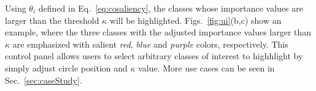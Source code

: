 Using $\theta_i$  defined in Eq.~\ref{eq:cosaliency}, the classes whose importance values are larger than the threshold $\kappa$ will be highlighted.
Figs.~\ref{fig:ui}(b,c) show an example, where the three classes with the adjusted importance values larger than $\kappa$ are emphasized with salient \emph{red}, \emph{blue} and \emph{purple} colors, respectively.
This control panel allows users to select arbitrary classes of interest to highhlight by simply adjust circle position and $\kappa$ value. More use cases can be seen in Sec.~\ref{sec:caseStudy}.

%
%
%
%
%
%
%
